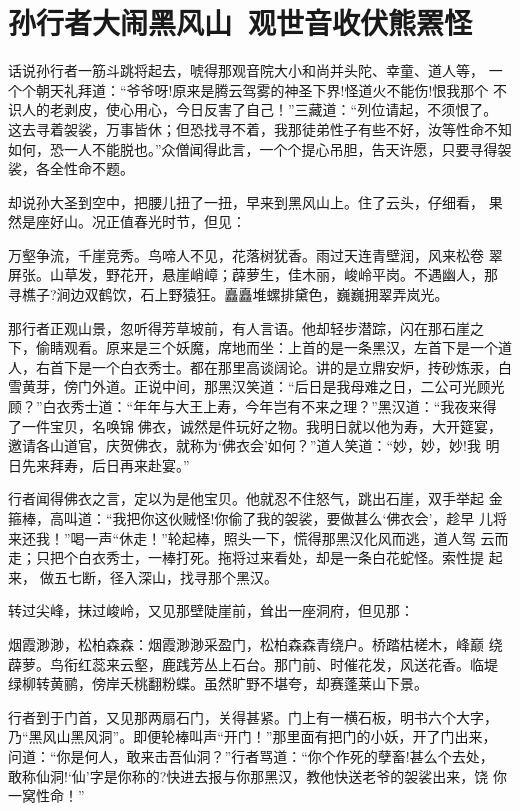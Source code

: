 \chapter{孙行者大闹黑风山~观世音收伏熊罴怪}

话说孙行者一筋斗跳将起去，唬得那观音院大小和尚并头陀、幸童、道人等，
一个个朝天礼拜道：“爷爷呀!原来是腾云驾雾的神圣下界!怪道火不能伤!恨我那个
不识人的老剥皮，使心用心，今日反害了自己！”三藏道：“列位请起，不须恨了。
这去寻着袈裟，万事皆休；但恐找寻不着，我那徒弟性子有些不好，汝等性命不知
如何，恐一人不能脱也。”众僧闻得此言，一个个提心吊胆，告天许愿，只要寻得袈
裟，各全性命不题。

却说孙大圣到空中，把腰儿扭了一扭，早来到黑风山上。住了云头，仔细看，
果然是座好山。况正值春光时节，但见：

万壑争流，千崖竞秀。鸟啼人不见，花落树犹香。雨过天连青壁润，风来松卷
翠屏张。山草发，野花开，悬崖峭嶂；薜萝生，佳木丽，峻岭平岗。不遇幽人，那
寻樵子?涧边双鹤饮，石上野猿狂。矗矗堆螺排黛色，巍巍拥翠弄岚光。

那行者正观山景，忽听得芳草坡前，有人言语。他却轻步潜踪，闪在那石崖之
下，偷睛观看。原来是三个妖魔，席地而坐：上首的是一条黑汉，左首下是一个道
人，右首下是一个白衣秀士。都在那里高谈阔论。讲的是立鼎安炉，抟砂炼汞，白
雪黄芽，傍门外道。正说中间，那黑汉笑道：“后日是我母难之日，二公可光顾光
顾？”白衣秀士道：“年年与大王上寿，今年岂有不来之理？”黑汉道：“我夜来得
了一件宝贝，名唤锦佛衣，诚然是件玩好之物。我明日就以他为寿，大开筵宴，
邀请各山道官，庆贺佛衣，就称为‘佛衣会’如何？”道人笑道：“妙，妙，妙!我
明日先来拜寿，后日再来赴宴。”

行者闻得佛衣之言，定以为是他宝贝。他就忍不住怒气，跳出石崖，双手举起
金箍棒，高叫道：“我把你这伙贼怪!你偷了我的袈裟，要做甚么‘佛衣会’，趁早
儿将来还我！”喝一声“休走！”轮起棒，照头一下，慌得那黑汉化风而逃，道人驾
云而走；只把个白衣秀士，一棒打死。拖将过来看处，却是一条白花蛇怪。索性提
起来，做五七断，径入深山，找寻那个黑汉。

转过尖峰，抹过峻岭，又见那壁陡崖前，耸出一座洞府，但见那：

烟霞渺渺，松柏森森：烟霞渺渺采盈门，松柏森森青绕户。桥踏枯槎木，峰巅
绕薜萝。鸟衔红蕊来云壑，鹿践芳丛上石台。那门前、时催花发，风送花香。临堤
绿柳转黄鹂，傍岸夭桃翻粉蝶。虽然旷野不堪夸，却赛蓬莱山下景。

行者到于门首，又见那两扇石门，关得甚紧。门上有一横石板，明书六个大字，
乃“黑风山黑风洞”。即便轮棒叫声“开门！”那里面有把门的小妖，开了门出来，
问道：“你是何人，敢来击吾仙洞？”行者骂道：“你个作死的孽畜!甚么个去处，
敢称仙洞!‘仙’字是你称的?快进去报与你那黑汉，教他快送老爷的袈裟出来，饶
你一窝性命！”

